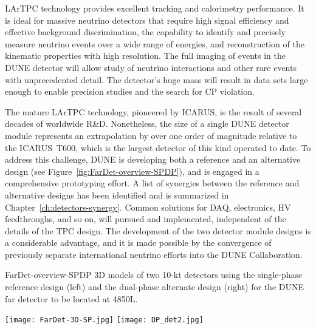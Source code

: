 LArTPC technology provides excellent tracking and calorimetry performance. It is
ideal for massive neutrino detectors that require high signal
efficiency and effective background discrimination, %
the capability to identify and precisely measure neutrino events over a
wide range of energies, and %
reconstruction of the kinematic
properties with  high resolution. The full imaging of events in the DUNE detector will
allow study of neutrino interactions and other rare events with
unprecedented detail. The detector's huge mass will %
result in data sets %
large enough to enable precision studies and the search for CP violation.

The mature LArTPC technology, pioneered by ICARUS, is the result of several decades of worldwide R\&D.
Nonetheless, the size of a single  DUNE detector module represents an
extrapolation by %
over one order of magnitude relative to  %
the ICARUS~T600, which is the largest detector of this kind operated to date. To address this challenge,
DUNE is developing both a reference and an
alternative design (see Figure~\ref{fig:FarDet-overview-SPDP}), and is engaged in a comprehensive prototyping
effort. %
A list of synergies
between the reference and alternative designs has been identified and is
summarized in Chapter~\ref{ch:detectors-synergy}. Common solutions for
DAQ, electronics, HV feedthroughs, and so on, will pursued and
implemented, independent of the details of the TPC design. The development of the two detector module designs is %
a considerable advantage, and it is made possible by the %
convergence of previously separate international neutrino efforts into the DUNE Collaboration.

\begin{cdrfigure}{FarDet-overview-SPDP}
{3D models of two 10-kt detectors using the single-phase reference design (left) 
and the dual-phase alternate design (right) for the DUNE far detector to be 
located at 4850L.}
\centering
\begin{minipage}[b]{1.0\textwidth}
\begin{center}
\texttt{[image: FarDet-3D-SP.jpg]}
\texttt{[image: DP\_det2.jpg]}
\end{center}
\end{minipage}
\end{cdrfigure}

